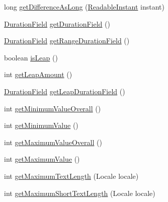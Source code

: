 \begin{DoxyCompactItemize}
\item 
long \hyperlink{classorg_1_1joda_1_1time_1_1field_1_1_abstract_readable_instant_field_property_a10b2b45dedec3cf875c2657877047966}{get\-Difference\-As\-Long} (\hyperlink{interfaceorg_1_1joda_1_1time_1_1_readable_instant}{Readable\-Instant} instant)
\item 
\hyperlink{classorg_1_1joda_1_1time_1_1_duration_field}{Duration\-Field} \hyperlink{classorg_1_1joda_1_1time_1_1field_1_1_abstract_readable_instant_field_property_a7db043b4b24391dd776ee42bf104fd2f}{get\-Duration\-Field} ()
\item 
\hyperlink{classorg_1_1joda_1_1time_1_1_duration_field}{Duration\-Field} \hyperlink{classorg_1_1joda_1_1time_1_1field_1_1_abstract_readable_instant_field_property_a7437c4e5383fc39bbab1a25916afef49}{get\-Range\-Duration\-Field} ()
\item 
boolean \hyperlink{classorg_1_1joda_1_1time_1_1field_1_1_abstract_readable_instant_field_property_ad83ce8fcb71d96ec3828b20c177e183c}{is\-Leap} ()
\item 
int \hyperlink{classorg_1_1joda_1_1time_1_1field_1_1_abstract_readable_instant_field_property_a0c5ba603801382d0b8abe0ecc9fe4c37}{get\-Leap\-Amount} ()
\item 
\hyperlink{classorg_1_1joda_1_1time_1_1_duration_field}{Duration\-Field} \hyperlink{classorg_1_1joda_1_1time_1_1field_1_1_abstract_readable_instant_field_property_a19064a2778fb14921b13f38a61addecd}{get\-Leap\-Duration\-Field} ()
\item 
int \hyperlink{classorg_1_1joda_1_1time_1_1field_1_1_abstract_readable_instant_field_property_a9defb0f3f09f951aa0c16dc12f5fd355}{get\-Minimum\-Value\-Overall} ()
\item 
int \hyperlink{classorg_1_1joda_1_1time_1_1field_1_1_abstract_readable_instant_field_property_a6c0b6fbbb19f0bbff4d728956f0f5845}{get\-Minimum\-Value} ()
\item 
int \hyperlink{classorg_1_1joda_1_1time_1_1field_1_1_abstract_readable_instant_field_property_a564248884fdde81f463f3c33ec05c83b}{get\-Maximum\-Value\-Overall} ()
\item 
int \hyperlink{classorg_1_1joda_1_1time_1_1field_1_1_abstract_readable_instant_field_property_a0d77f5d57f4e5a54bcd5a0557c2b9c2d}{get\-Maximum\-Value} ()
\item 
int \hyperlink{classorg_1_1joda_1_1time_1_1field_1_1_abstract_readable_instant_field_property_a960d2ce8787a69ad934790ba438b479e}{get\-Maximum\-Text\-Length} (Locale locale)
\item 
int \hyperlink{classorg_1_1joda_1_1time_1_1field_1_1_abstract_readable_instant_field_property_a5e1a728b18d88caf7ecaddabb5a54e8b}{get\-Maximum\-Short\-Text\-Length} (Locale locale)

\end{DoxyCompactItemize}
